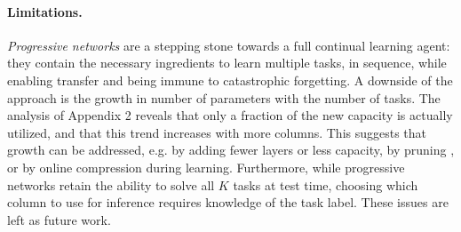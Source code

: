 \paragraph{Limitations.}
\textit{Progressive networks} are a stepping stone towards a full continual
learning agent: they contain the necessary ingredients to learn multiple tasks,
in sequence, while enabling transfer and being immune to catastrophic
forgetting. A downside of the approach is the growth in number of
parameters with the number of tasks.
The analysis of Appendix 2 reveals
that only a fraction of the new capacity is actually utilized, and that this trend increases with more columns. This
suggests that growth can be addressed, e.g. by adding fewer layers or less capacity, by pruning \cite{Cun90optimalbrain}, or by online compression
\cite{Rusu15} during learning.  Furthermore, while progressive networks retain the
ability to solve all $K$ tasks at test time, choosing which column to use for
inference requires knowledge of the task label. These issues are left as future
work.
